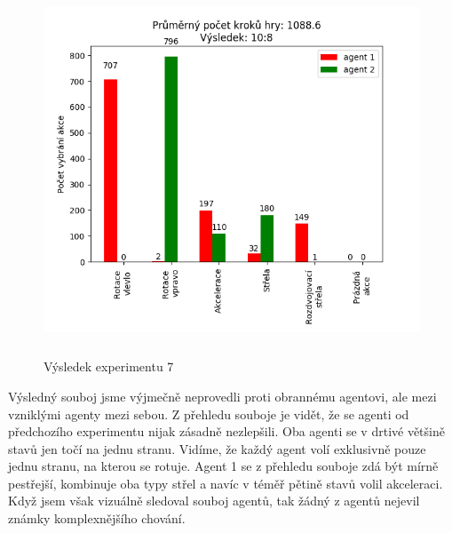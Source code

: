 \begin{figure}[p]\centering
\includegraphics[width=145mm, height=110mm]{./Obrazky/Experiment07Results.png}
\caption{Výsledek experimentu 7}
\label{Výsledek experimentu 07}
\end{figure}


Výsledný souboj jsme výjmečně neprovedli proti obrannému agentovi, ale mezi vzniklými agenty mezi sebou.
Z přehledu souboje je vidět, že se agenti od předchozího experimentu nijak zásadně nezlepšili. Oba agenti se v drtivé většině stavů jen točí na jednu stranu.
Vidíme, že každý agent volí exklusivně pouze jednu stranu, na kterou se rotuje. 
Agent 1 se z přehledu souboje zdá být mírně pestřejší, kombinuje oba typy střel a navíc v téměř pětině stavů volil akceleraci.
Když jsem však vizuálně sledoval souboj agentů, tak žádný z agentů nejevil známky komplexnějšího chování. 